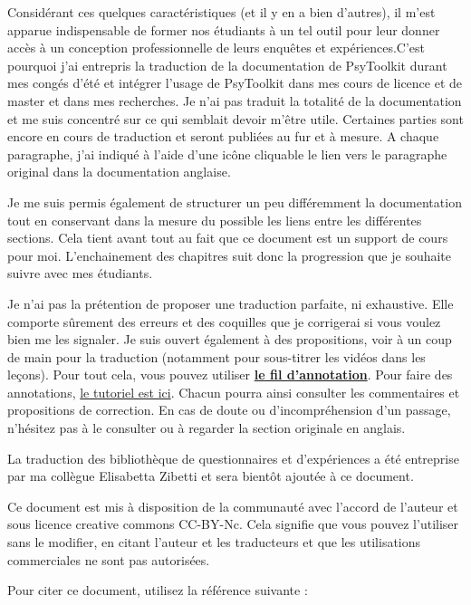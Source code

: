 \documentclass[
]{book}
\begin{document}
Considérant ces quelques caractéristiques (et il y en a bien d'autres), il m'est apparue indispensable de former nos étudiants à un tel outil pour leur donner accès à un conception professionnelle de leurs enquêtes et expériences.C'est pourquoi j'ai entrepris la traduction de la documentation de PsyToolkit durant mes congés d'été et intégrer l'usage de PsyToolkit dans mes cours de licence et de master et dans mes recherches. Je n'ai pas traduit la totalité de la documentation et me suis concentré sur ce qui semblait devoir m'être utile. Certaines parties sont encore en cours de traduction et seront publiées au fur et à mesure. A chaque paragraphe, j'ai indiqué à l'aide d'une icône cliquable le lien vers le paragraphe original dans la documentation anglaise.

Je me suis permis également de structurer un peu différemment la documentation tout en conservant dans la mesure du possible les liens entre les différentes sections. Cela tient avant tout au fait que ce document est un support de cours pour moi. L'enchainement des chapitres suit donc la progression que je souhaite suivre avec mes étudiants.

Je n'ai pas la prétention de proposer une traduction parfaite, ni exhaustive. Elle comporte sûrement des erreurs et des coquilles que je corrigerai si vous voulez bien me les signaler. Je suis ouvert également à des propositions, voir à un coup de main pour la traduction (notamment pour sous-titrer les vidéos dans les leçons). Pour tout cela, vous pouvez utiliser \href{https://hyp.is/go?url=https\%3A\%2F\%2Fjmeunierp8.github.io\%2FPsytoolkit\%2F\&group=__world__}{\textbf{le fil d'annotation}}. Pour faire des annotations, \href{https://jmeunierp8.github.io/Guide-utilisateur-Hypothesis/s3.html}{le tutoriel est ici}. Chacun pourra ainsi consulter les commentaires et propositions de correction. En cas de doute ou d'incompréhension d'un passage, n'hésitez pas à le consulter ou à regarder la section originale en anglais.

La traduction des bibliothèque de questionnaires et d'expériences a été entreprise par ma collègue Elisabetta Zibetti et sera bientôt ajoutée à ce document.

Ce document est mis à disposition de la communauté avec l'accord de l'auteur et sous licence creative commons CC-BY-Nc. Cela signifie que vous pouvez l'utiliser sans le modifier, en citant l'auteur et les traducteurs et que les utilisations commerciales ne sont pas autorisées.

Pour citer ce document, utilisez la référence suivante :
\end{document}
